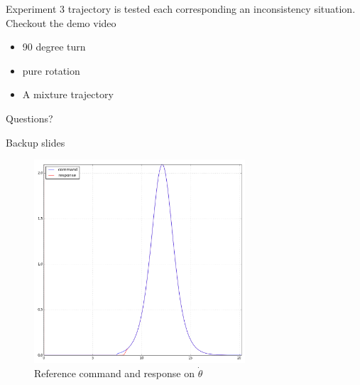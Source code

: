 \documentclass[10pt]{beamer}
\begin{document}
\begin{frame}{Experiment}
  3 trajectory is tested each corresponding an inconsistency situation.\\
  Checkout the demo video
  \begin{itemize}
      \item 90 degree turn 
      \item pure rotation
      \item A mixture trajectory
  \end{itemize}
\end{frame}

  
\begin{frame}[standout]
  Questions?
\end{frame}
\appendix

\begin{frame}[fragile]{Backup slides}
  \begin{figure}[!h]
    \centering
    \includegraphics[width=0.7\textwidth]{Figure/PR_t.png}  
    \caption{Reference command and response on $\dot{\theta}$}
    \label{fig:PR_t}
\end{figure}
\end{frame}

\end{document}
